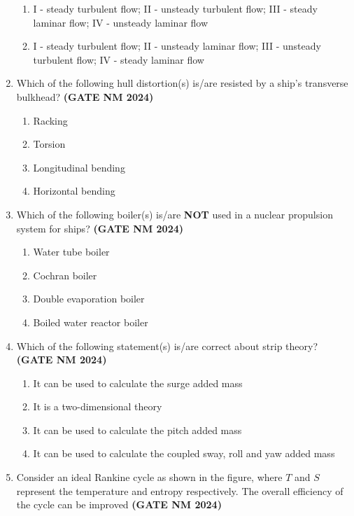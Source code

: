 \documentclass[journal,15pt,onecolumn]{IEEEtran}
\theoremstyle{remark}
\begin{document}
\begin{enumerate}
\begin{enumerate}
    \item I - steady turbulent flow; II - unsteady turbulent flow; 
    III - steady laminar flow; IV - unsteady laminar flow

    \item I - steady turbulent flow; II - unsteady laminar flow; 
    III - unsteady turbulent flow; IV - steady laminar flow
\end{enumerate}


\item
Which of the following hull distortion(s) is/are resisted by a ship’s transverse bulkhead?\hfill \textbf{ (GATE NM 2024)}
    \begin{enumerate}
    
        \item Racking
        \item Torsion
        \item Longitudinal bending
        \item Horizontal bending
    \end{enumerate}

    \item
    Which of the following boiler(s) is/are \textbf{NOT} used in a nuclear propulsion system for ships?\hfill \textbf{ (GATE NM 2024)}
    
    \begin{enumerate}
        \item Water tube boiler
        \item Cochran boiler
        \item Double evaporation boiler
        \item Boiled water reactor boiler
    \end{enumerate}


\item
Which of the following statement(s) is/are correct about strip theory?\hfill \textbf{ (GATE NM 2024)}
    \begin{enumerate}
        \item It can be used to calculate the surge added mass
        \item It is a two-dimensional theory
        \item It can be used to calculate the pitch added mass
        \item It can be used to calculate the coupled sway, roll and yaw added mass
    \end{enumerate}

    \item
    Consider an ideal Rankine cycle as shown in the figure, where $T$ and $S$ represent the temperature and entropy respectively. 
    The overall efficiency of the cycle can be improved \hfill \textbf{ (GATE NM 2024)}


\end{enumerate}
\end{document}
